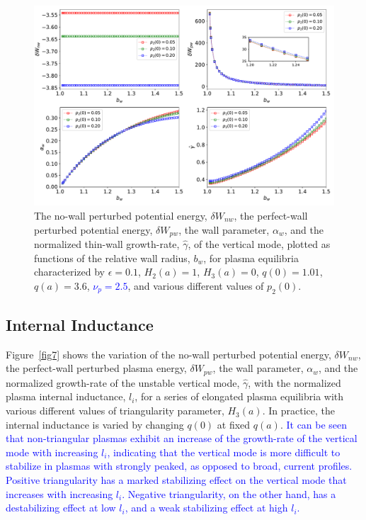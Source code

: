 \documentclass[12pt,prb,aps]{revtex4-1}
\begin{document}
\begin{figure}
\centerline{\includegraphics[width=\textwidth]{Fig6.pdf}}
\caption{The no-wall perturbed potential energy, $\delta W_{nw}$, the perfect-wall perturbed potential energy, $\delta W_{pw}$, the wall
parameter, $\alpha_w$, and the normalized thin-wall growth-rate, $\hat{\gamma}$,  of the vertical mode, plotted as  functions of the
relative wall radius, $b_w$, for plasma equilibria characterized by  $\epsilon=0.1$, $H_2(a)=1$, $H_3(a)=0$, $q(0)=1.01$, $q(a)=3.6$, \textcolor{blue}{$\nu_p=2.5$}, and various different values of $p_2(0)$.\label{fig6}}
\end{figure}

\subsection{Internal Inductance}
Figure~\ref{fig7} shows the variation of the no-wall perturbed potential energy, $\delta W_{nw}$, the perfect-wall perturbed plasma energy, $\delta W_{pw}$, the wall 
parameter, $\alpha_w$, and the normalized growth-rate of the unstable vertical mode, $\hat{\gamma}$, with the normalized plasma internal inductance, $l_i$,   for a series of
elongated plasma equilibria with various different values of triangularity parameter, $H_3(a)$. In practice, the internal inductance is varied by changing $q(0)$ at
fixed $q(a)$. \textcolor{blue}{ It can be seen that  non-triangular plasmas exhibit an increase of the growth-rate of the vertical mode with increasing $l_i$, indicating that the vertical
mode is more difficult to stabilize in plasmas with strongly peaked, as opposed to  broad, current profiles.\cite{hump} 
Positive triangularity has a marked stabilizing effect on the vertical mode that increases with increasing $l_i$. Negative triangularity,
on the other hand, has a destabilizing effect at low $l_i$, and a weak stabilizing effect at high $l_i$. }
\end{document}
